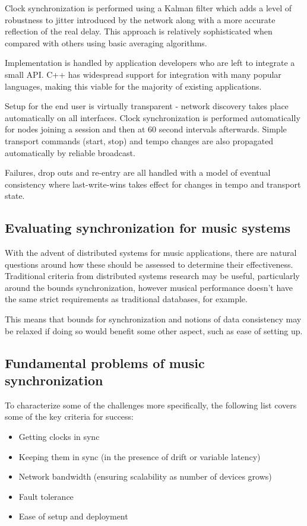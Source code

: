 \documentclass[11pt]{article} %
\theoremstyle{plain}
\theoremstyle{definition}
\begin{document}
Clock synchronization is performed using a Kalman
filter\cite{bletsas2005evaluation} which adds a level of robustness to jitter
introduced by the network along with a more accurate reflection of the real
delay. This approach is relatively sophisticated when compared with others
using basic averaging algorithms.

Implementation is handled by application developers who are left to integrate a
small API. C++ has widespread support for integration with many popular
languages, making this viable for the majority of existing applications.

Setup for the end user is virtually transparent - network discovery takes place
automatically on all interfaces. Clock synchronization is performed
automatically for nodes joining a session and then at 60 second intervals
afterwards. Simple transport commands (start, stop) and tempo changes are also
propagated automatically by reliable broadcast.

Failures, drop outs and re-entry are all handled with a model of eventual
consistency where last-write-wins takes effect for changes in tempo and
transport state.

\subsection{Evaluating synchronization for music systems}

With the advent of distributed systems for music applications, there are
natural questions around how these should be assessed to determine
their effectiveness. Traditional criteria from distributed systems research
may be useful, particularly around the bounds synchronization, however musical
performance doesn't have the same strict requirements as traditional databases,
for example.

This means that bounds for synchronization and notions of data consistency may
be relaxed if doing so would benefit some other aspect, such as ease of setting
up.

\subsection{Fundamental problems of music synchronization}

To characterize some of the challenges more specifically, the following list
covers some of the key criteria for success:

\begin{itemize}
  \item Getting clocks in sync \cite[Chapter~6.3.2]{attiya2004distributed}
  \item Keeping them in sync (in the presence of drift or variable latency) \cite[Chapter~13]{attiya2004distributed}
  \item Network bandwidth (ensuring scalability as number of devices grows)
  \item Fault tolerance %
  \item Ease of setup and deployment
\end{itemize}
\end{document}
